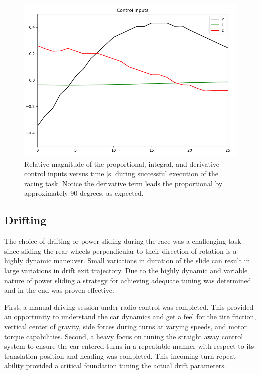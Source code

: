 \documentclass[letterpaper, 10 pt, conference]{ieeeconf}  %
\begin{document}
\begin{figure}[b]
    \centering
    \includegraphics[width=\columnwidth]{Figures/controlInputs.png}
    \caption{Relative magnitude of the proportional, integral, and derivative control inputs versus time [s] during successful execution of the racing task. Notice the derivative term leads the proportional by approximately 90 degrees, as expected. }
    \label{PIDsuccess}
\end{figure}

\subsection{Drifting}
The choice of drifting or power sliding during the race was a challenging task since sliding the rear wheels perpendicular to their direction of rotation is a highly dynamic maneuver. Small variations in duration of the slide can result in large variations in drift exit trajectory. Due to the highly dynamic and variable nature of power sliding a strategy for achieving adequate tuning was determined and in the end was proven effective. 



First, a manual driving session under radio control was completed. This provided an opportunity to understand the car dynamics and get a feel for the tire friction, vertical center of gravity, side forces during turns at varying speeds, and motor torque capabilities. Second, a heavy focus on tuning the straight away control system to ensure the car entered turns in a repeatable manner with respect to its translation position and heading was completed. This incoming turn repeat-ability provided a critical foundation tuning the actual drift parameters.
\end{document}

